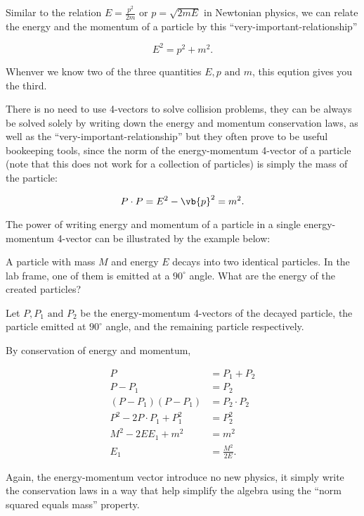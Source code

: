 \documentclass[english,a4paper,12pt]{report}
\begin{document}
Similar to the relation \(E = \frac{p^2}{2m} \text { or } p = \sqrt{2mE}  \) in Newtonian physics, we can relate the energy and the momentum of a particle by this ``very-important-relationship''

\begin{equation}\label{veryimportantrelationship} 
    E^2 = p^2 + m^2.
\end{equation}

Whenver we know two of the three quantities \(E,p \text { and }  m\), this eqution gives you the third.

There is no need to use 4-vectors to solve collision problems, they can be always be solved solely by writing down the energy and momentum conservation laws, as well as the ``very-important-relationship'' but they often prove to be useful bookeeping tools, since the norm of the energy-momentum 4-vector of a particle (note that this does not work for a collection of particles) is simply the mass of the particle: 

\begin{equation}
    P \cdot P = E^2 - \vb{p} ^2 = m^2.
\end{equation}

The power of writing energy and momentum of a particle in a single energy-momentum 4-vector can be illustrated by the example below:

{A particle with mass \(M\) and energy \(E\) decays into two identical particles. In the lab frame, one of them is emitted at a \(90 ^\circ \) angle. What are the energy of the created particles? }
{Let \(P, P_1 \text { and } P_2 \) be the energy-momentum 4-vectors of the decayed particle, the particle emitted at \(90 ^\circ \) angle, and the remaining particle respectively. 

By conservation of energy and momentum,

\begin{equation}
    \begin{aligned}
        P &= P_1 + P_2 \\
        P-P_1  &= P_2 \\
        (P - P_1 )(P - P_1 ) &= P_2 \cdot P_2 \\
        P^2 - 2 P \cdot  P_1  + P_1 ^2 &= P_2 ^2 \\
        M^2 - 2E E_1  + m^2 &= m^2 \\
        E_1  & = \frac{M^2}{2E}. 
    \end{aligned}
\end{equation}

Again, the energy-momentum vector introduce no new physics, it simply write the conservation laws in a way that help simplify the algebra using the ``norm squared equals mass'' property.
} 
\end{document}
